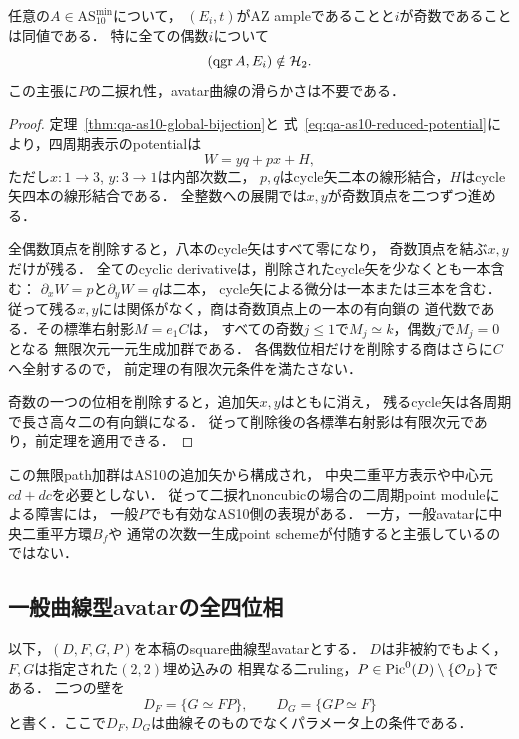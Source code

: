 \begin{proposition}[最小十本矢型では偶数位相が生成しない]
\label{prop:qa-as10-general-even-obstruction}
任意の$A\in\mathrm{AS}_{10}^{\mathrm{min}}$について，
$(E_i,t)$がAZ ampleであることと$i$が奇数であることは同値である．
特に全ての偶数$i$について
\[
 (\operatorname{qgr} A,E_i)\notin\mathcal H_2.
\]
この主張に$P$の二捩れ性，avatar曲線の滑らかさは不要である．
\end{proposition}
\begin{proof}
定理~\ref{thm:qa-as10-global-bijection}と
式~\eqref{eq:qa-as10-reduced-potential}により，四周期表示のpotentialは
\[
 W=yq+px+H,
\]
ただし$x:1\to3$, $y:3\to1$は内部次数二，
$p,q$はcycle矢二本の線形結合，$H$はcycle矢四本の線形結合である．
全整数への展開では$x,y$が奇数頂点を二つずつ進める．

全偶数頂点を削除すると，八本のcycle矢はすべて零になり，
奇数頂点を結ぶ$x,y$だけが残る．
全てのcyclic derivativeは，削除されたcycle矢を少なくとも一本含む：
$\partial_xW=p$と$\partial_yW=q$は二本，
cycle矢による微分は一本または三本を含む．
従って残る$x,y$には関係がなく，商は奇数頂点上の一本の有向鎖の
道代数である．その標準右射影$M=e_1C$は，
すべての奇数$j\le1$で$M_j\simeq k$，偶数$j$で$M_j=0$となる
無限次元一元生成加群である．
各偶数位相だけを削除する商はさらに$C$へ全射するので，
前定理の有限次元条件を満たさない．

奇数の一つの位相を削除すると，追加矢$x,y$はともに消え，
残るcycle矢は各周期で長さ高々二の有向鎖になる．
従って削除後の各標準右射影は有限次元であり，前定理を適用できる．
\end{proof}

\begin{remark}
この無限path加群はAS10の追加矢から構成され，
中央二重平方表示や中心元$cd+dc$を必要としない．
従って二捩れnoncubicの場合の二周期point moduleによる障害には，
一般$P$でも有効なAS10側の表現がある．
一方，一般avatarに中央二重平方環$B_f$や
通常の次数一生成point schemeが付随すると主張しているのではない．
\end{remark}

\subsection{一般曲線型avatarの全四位相}

以下，$(D,F,G,P)$を本稿のsquare曲線型avatarとする．
$D$は非被約でもよく，$F,G$は指定された$(2,2)$埋め込みの
相異なる二ruling，$P\in\operatorname{Pic}^0(D)\setminus\{\mathcal O_D\}$である．
二つの壁を
\[
 D_F=\{G\simeq FP\},\qquad D_G=\{GP\simeq F\}
\]
と書く．ここで$D_F,D_G$は曲線そのものでなくパラメータ上の条件である．

